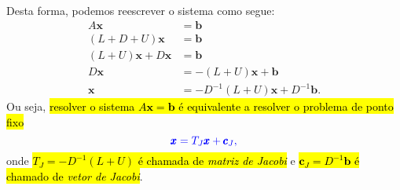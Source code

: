Desta forma, podemos reescrever o sistema como segue:
\begin{align}
  A\pmb{x} &= \pmb{b}\\
  (L + D + U)\pmb{x} &= \pmb{b}\\
  (L + U)\pmb{x} + D\pmb{x} &= \pmb{b}\\
  D\pmb{x} &= -(L+U)\pmb{x} + \pmb{b}\\
  \pmb{x} &= -D^{-1}(L+U)\pmb{x} + D^{-1}\pmb{b}.
\end{align}
Ou seja, \hl{resolver o sistema $A\pmb{x} = \pmb{b}$ é equivalente a resolver o problema de ponto fixo}
\begin{equation}
  \color{blue}\pmb{x} = T_J\pmb{x} + \pmb{c}_J,
\end{equation}
onde \hl{$T_J = -D^{-1}(L+U)$ é chamada de \emph{matriz de Jacobi}} e \hl{$\pmb{c}_J = D^{-1}\pmb{b}$ é chamado de \emph{vetor de Jacobi}}.

